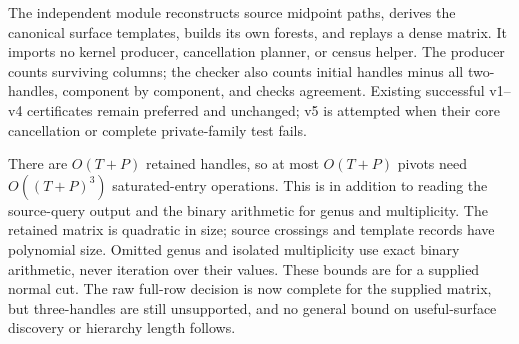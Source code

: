 The independent module  reconstructs
source midpoint paths, derives the canonical surface templates, builds its
own forests, and replays a dense matrix. It imports no kernel producer,
cancellation planner, or census helper. The producer counts surviving
columns; the checker also counts initial handles minus all two-handles,
component by component, and checks agreement. Existing successful v1--v4
certificates remain preferred and unchanged; v5 is attempted when their
core cancellation or complete private-family test fails.

There are $O(T+P)$ retained handles, so at most $O(T+P)$ pivots need
$O((T+P)^3)$ saturated-entry operations. This is in addition to reading the source-query output and the binary
arithmetic for genus and multiplicity. The retained matrix is quadratic
in size; source crossings and template records have polynomial size.
Omitted genus and isolated multiplicity use exact binary arithmetic, never
iteration over their values. These bounds are for a supplied normal cut.
The raw full-row decision is now complete for the supplied matrix, but
three-handles are still unsupported,
and no general bound on useful-surface discovery or hierarchy length follows.


